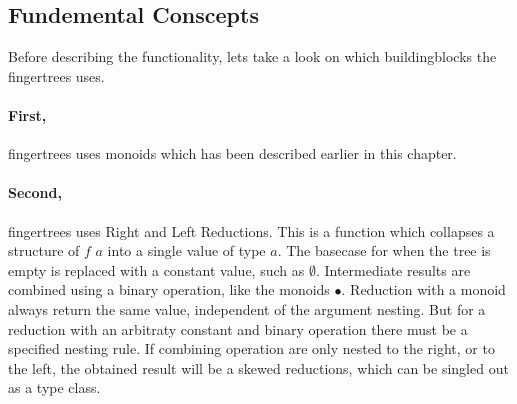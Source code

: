 \subsection{Fundemental Conscepts}
Before describing the functionality, lets take a look on which buildingblocks
the fingertrees uses.
\paragraph{First,}
fingertrees uses monoids which has been described earlier in this chapter.
\paragraph{Second,} 
fingertrees uses Right and Left Reductions. This is a function which
collapses a structure of $f$ $a$ into a single value of type $a$. The basecase
for when the tree is empty is replaced with a constant value, such as 
$\emptyset$. Intermediate results are combined using a binary operation, like
the monoids $\bullet$. Reduction with a monoid always return the same value,
independent of the argument nesting. But for a reduction with an arbitraty
constant and binary operation there must be a specified nesting rule. If
combining operation are only nested to the right, or to the left, the obtained
result will be a skewed reductions, which can be singled out as a type class.


